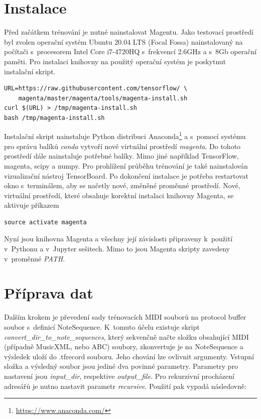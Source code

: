 \section{Instalace}
Před začátkem trénování je nutné nainstalovat Magentu.
Jako testovací prostředí byl zvolen operační systém Ubuntu 20.04 LTS (Focal Fossa)
nainstalovaný na počítači s~procesorem Intel Core i7-4720HQ s~frekvencí 2.6GHz
a s~8Gb operační paměti. 
Pro instalaci knihovny na použitý operační systém je poskytnut instalační skript.

\begin{verbatim}
URL=https://raw.githubusercontent.com/tensorflow/ \
    magenta/master/magenta/tools/magenta-install.sh
curl $(URL) > /tmp/magenta-install.sh
bash /tmp/magenta-install.sh    
\end{verbatim}
Instalační skript nainstaluje Python distribuci Anaconda\footnote{\url{https://www.anaconda.com/}}
a s~pomocí systému pro správu balíků \emph{conda} vytvoří nové virtuální prostředí \emph{magenta}.
Do tohoto prostředí dále nainstaluje potřebné balíky.
Mimo jiné například TensorFlow, magenta, scipy a numpy.
Pro prohlížení průběhu trénování je také nainstalován vizualizační nástroj TensorBoard.
Po dokončení instalace je potřeba restartovat okno s~terminálem,
aby se načetly nové, změněné proměnné prostředí.
Nové, virtuální prostředí, které obsahuje korektní instalaci knihovny Magenta,
se aktivuje příkazem

\begin{verbatim}
source activate magenta
\end{verbatim}
Nyní jsou knihovna Magenta a všechny její závislosti 
připraveny k~použití v~Pythonu a v~Jupyter sešitech.
Mimo to jsou Magenta skripty zavedeny v~proměnné \emph{PATH}.
\cite{google_git_polyphony}
\par

\section{Příprava dat}
Dalším krokem je převedení sady trénovacích MIDI souborů na protocol buffer soubor
s~definicí NoteSequence.
K~tomuto účelu existuje skript \emph{convert\_dir\_to\_note\_sequences}, 
který sekvenčně načte složku obsahující MIDI (případně MusicXML, nebo ABC) soubory,
zkonvertuje je na NoteSequence a výsledek uloží do .tfrecord souboru.
Jeho chování lze ovlivnit argumenty.
Vstupní složka a výsledný soubor jsou jediné dva povinné parametry.
Parametry pro nastavení jsou \emph{input\_dir}, respektive \emph{output\_file}.
Pro rekurzivní procházení adresářů je nutno nastavit parametr \emph{recursive}.
\cite{google_git_polyphony}
Použití  pak vypadá následovně:

